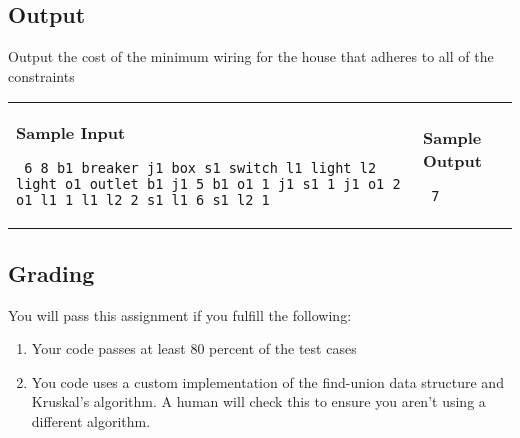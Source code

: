 \documentclass[11pt]{article}
\begin{document}
\subsection*{Output}

Output the cost of the minimum wiring for the house that adheres to all of the constraints

\vspace{0.25in}\hspace{-0.3in}\begin{tabular}{ll}

\parbox{3in}{{\large\bf Sample Input}

\vspace{0.15in}

{\tt 
6 8\linebreak
b1 breaker\linebreak
j1 box\linebreak
s1 switch\linebreak
l1 light\linebreak
l2 light\linebreak
o1 outlet\linebreak
b1 j1 5\linebreak
b1 o1 1\linebreak
j1 s1 1\linebreak
j1 o1 2\linebreak
o1 l1 1\linebreak
l1 l2 2\linebreak
s1 l1 6\linebreak
s1 l2 1\linebreak
}
}

&

\parbox{3in}{{\large\bf Sample Output}

\vspace{0.15in}

{\tt
7
}
}

\\
\end{tabular}

\subsection*{Grading}

You will pass this assignment if you fulfill the following:

\begin{enumerate}
	\item Your code passes at least 80 percent of the test cases
	\item You code uses a custom implementation of the find-union data structure and Kruskal's algorithm. A human will check this to ensure you aren't using a different algorithm.
\end{enumerate}
\end{document}
